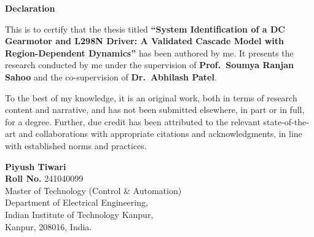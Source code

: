 \documentclass[12pt, a4paper, twoside, openright]{Thesis} %
\newcommand\myemptypage{
    \null
    \thispagestyle{empty}
    \addtocounter{page}{-1}
    \newpage
    }
\begin{document}
\clearpage 

\setcounter{page}{3}  
\thispagestyle{plain} 

\begin{center}
    \LARGE \textbf{Declaration}
\end{center}
\vspace{1em}

This is to certify that the thesis titled \textbf{``System Identification of a DC Gearmotor and L298N Driver: A Validated Cascade Model with Region-Dependent Dynamics''} has been authored by me.
It presents the research conducted by me under the supervision of \textbf{Prof.\ Soumya Ranjan Sahoo} and the co-supervision of \textbf{Dr.\ Abhilash Patel}.\par

To the best of my knowledge, it is an original work, both in terms of research content and narrative, and has not been submitted elsewhere, in part or in full, for a degree.
Further, due credit has been attributed to the relevant state-of-the-art and collaborations with appropriate citations and acknowledgments, in line with established norms and practices.
\bigskip
\bigskip
\bigskip
\bigskip

\begin{flushright}
   \vspace{2mm}
\textbf{Piyush Tiwari} \\
\textbf{Roll No.} 241040099 \\
Master of Technology (Control \& Automation)\\
Department of Electrical Engineering, \\
Indian Institute of Technology Kanpur,\\
Kanpur, 208016, India.
\end{flushright}

\newpage
\myemptypage
\end{document}

